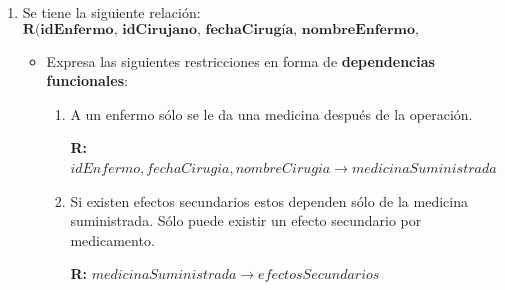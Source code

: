 \documentclass[a4paper, 12pt]{report}
\begin{document}
\begin{enumerate}
\begin{itemize}
\end{itemize}

	\item Se tiene la siguiente relación: 
	$$\textbf{R(idEnfermo, idCirujano, fechaCirugía, nombreEnfermo, direcciónEnfermo, nombreCirujano, nombreCirugía, medicinaSuministrada, efectosSecundarios)}$$
	\begin{itemize}
		\item Expresa las siguientes restricciones en forma de \textbf{dependencias funcionales}: 
		\begin{enumerate}
		\item A un enfermo sólo se le da una medicina después de la operación.
		
		\textbf{R:} $idEnfermo,fechaCirugia,nombreCirugia \rightarrow medicinaSuministrada$

		\item Si existen efectos secundarios estos dependen sólo de la medicina suministrada. Sólo puede existir un efecto secundario por medicamento. 
		
		\textbf{R:} $medicinaSuministrada \rightarrow efectosSecundarios$
		\end{enumerate}
	\end{itemize}
\end{enumerate}
\end{document}
